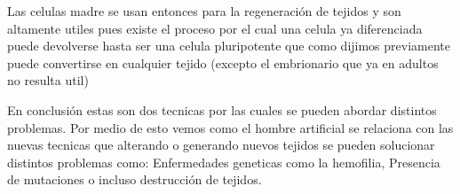 \documentclass[12pt]{exam}
\begin{document}
Las celulas madre se usan entonces para la regeneración de tejidos y son altamente utiles pues existe el proceso por el cual una celula ya diferenciada puede devolverse hasta ser una celula pluripotente que como dijimos previamente puede convertirse en cualquier tejido (excepto el embrionario que ya en adultos no resulta util)

En conclusión estas son dos tecnicas por las cuales se pueden abordar distintos problemas. Por medio de esto vemos como el hombre artificial se relaciona con las nuevas tecnicas que alterando o generando nuevos tejidos se pueden solucionar distintos problemas como: Enfermedades geneticas como la hemofilia, Presencia de mutaciones o incluso destrucción de tejidos.
\end{document}
